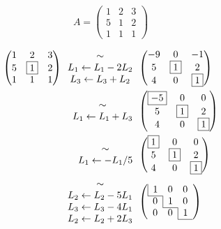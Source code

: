 \begin{exm}
	 \[
		A = \begin{pmatrix}
			1 & 2 & 3\\
			5 & 1 & 2\\
			1 & 1 & 1
		\end{pmatrix}
	\] 

	\begin{align*}
		\begin{pmatrix}
			1 & 2 & 3\\
			5 & \bx 1 & 2\\
			1 & 1 & 1
		\end{pmatrix}
		\begin{array}{c}
			\sim\\
			L_1 \leftarrow L_1 - 2L_2\\
			L_3 \leftarrow L_3 + L_2
		\end{array}&
		\begin{pmatrix}
			-9&0&-1\\
			5&\bx 1&2\\
			4&0&\bx 1
		\end{pmatrix}\\
		\begin{array}{c}
			\sim\\
			L_1 \leftarrow L_1 + L_3
		\end{array}&
		\begin{pmatrix}
			\bx {-5} & 0 & 0\\
			5&\bx 1 &2\\
			4 & 0 & \bx 1
		\end{pmatrix}\\
		\begin{array}{c}
			\sim\\
			L_1 \leftarrow -L_1/5
		\end{array}&
		\begin{pmatrix}
			\bx 1 & 0 & 0\\
			5 & \bx 1 & 2\\
			4 & 0 & \bx 1
		\end{pmatrix}\\
		\begin{array}{c}
			\sim\\
			L_2 \leftarrow L_2 - 5L_1\\
			L_3 \leftarrow L_3  - 4L_1\\
			L_2 \leftarrow L_2 + 2 L_3
		\end{array}&
		\left(\begin{array}{c c c}
			\multicolumn{1}{|c}1 & 0 & 0\\ \cline{1-1}
			0 & \multicolumn{1}{|c}1 & 0\\ \cline{2-1}
			0 & 0 & \multicolumn{1}{|c}1\\ \cline{3-1}
		\end{array}\right)
	\end{align*}
\end{exm}

